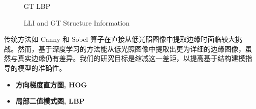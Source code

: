 \documentclass[CJK,aspectratio=169]{beamer}  %
\begin{document}
\begin{frame}
\begin{figure}
\begin{minipage}{.19\textwidth}
				\caption*{\tiny GT LBP}
				\label{fig: GT_lbp}	
			\end{minipage}
			\captionsetup{font=scriptsize}
			\caption{
				\label{fig: LLI Structure Information}
				LLI and GT Structure Information
			}
		\end{figure}
		
		\vspace{-0.5cm}
		
		{ \yahei 传统方法如 Canny 和 Sobel 算子\textcolor{blue}{\cite{maini2009study}}在直接从低光照图像中提取边缘时面临较大挑战。然而，基于深度学习的方法能从低光照图像中提取出更为详细的边缘图像，虽然与真实边缘仍有差异。我们的研究目标是缩减这一差距，以提高基于结构建模指导的模型的准确性。}
	\end{frame}
	
	\begin{frame}
		
		\begin{itemize}
			\item \textbf{方向梯度直方图, HOG}
			\vspace{.3cm}
			
			
			
		\end{itemize}
		
		\begin{itemize} 
			\item \textbf{局部二值模式图, LBP}
			\vspace{.3cm}
			

\end{itemize}
\end{frame}
\end{document}
